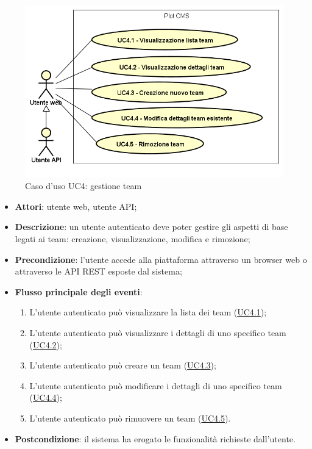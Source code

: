         \begin{figure}
            \centering
            \includegraphics[scale=0.95, width=\textwidth]{immagini/usecase/UC4.png}
            \caption{Caso d'uso UC4: gestione team}\label{fig:UC4} 
        \end{figure}
\begin{itemize}
\item \textbf{Attori}: utente web, utente API;
\item \textbf{Descrizione}: un utente autenticato deve poter gestire gli aspetti di base legati ai team: creazione, visualizzazione, modifica e rimozione; 
      \item \textbf{Precondizione}: l'utente accede alla piattaforma attraverso un browser web o attraverso le API REST esposte dal sistema;

        \item \textbf{Flusso principale degli eventi}:
          \begin{enumerate}
          \item L'utente autenticato può visualizzare la lista dei team (\hyperlink{UC4.1}{UC4.1});
          \item L'utente autenticato può visualizzare i dettagli di uno specifico team (\hyperlink{UC4.2}{UC4.2});
          \item L'utente autenticato può creare un team (\hyperlink{UC4.3}{UC4.3});
          \item L'utente autenticato può modificare i dettagli di uno specifico team (\hyperlink{UC4.4}{UC4.4});
          \item L'utente autenticato può rimuovere un team (\hyperlink{UC4.5}{UC4.5}).

      \end{enumerate}
    \item \textbf{Postcondizione}: il sistema ha erogato le funzionalità richieste dall'utente.
  \end{itemize}
\hypertarget{UC4.1}{}
